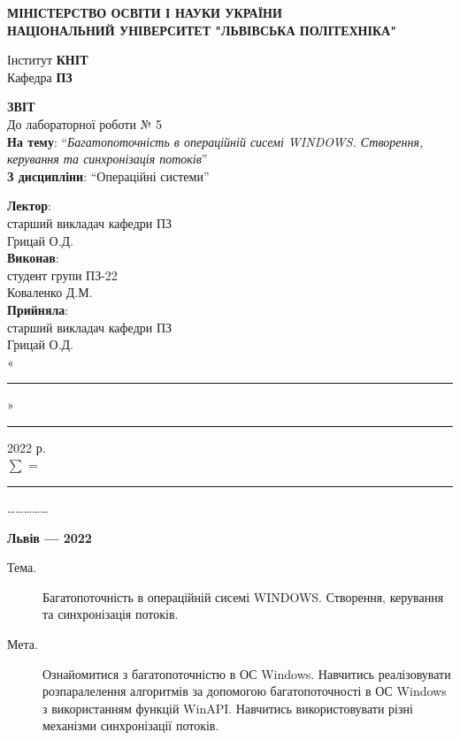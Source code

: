 \documentclass{article}
\newcommand\subject{Операційні системи}
\newcommand\lecturer{старший викладач кафедри ПЗ\\Грицай О.Д.}
\newcommand\teacher{старший викладач кафедри ПЗ\\Грицай О.Д.}
\newcommand\mygroup{ПЗ-22}
\newcommand\lab{5}
\newcommand\theme{Багатопоточність в операційній сисемі WINDOWS. Створення,
	керування та синхронізація потоків}
\newcommand\purpose{Ознайомитися з багатопоточністю в ОС Windows. Навчитись
	реалізовувати розпаралелення алгоритмів за допомогою багатопоточності в ОС
	Windows з використанням функцій WinAPI. Навчитись використовувати різні
	механізми синхронізації потоків}
\begin{document}
\begin{normalsize}
	\begin{titlepage}
		\thispagestyle{empty}
		\begin{center}
			\textbf{МІНІСТЕРСТВО ОСВІТИ І НАУКИ УКРАЇНИ\\
				НАЦІОНАЛЬНИЙ УНІВЕРСИТЕТ "ЛЬВІВСЬКА ПОЛІТЕХНІКА"}
		\end{center}
		\begin{flushright}
			Інститут \textbf{КНІТ}\\
			Кафедра \textbf{ПЗ}
		\end{flushright}
		\vspace{200pt}
		\begin{center}
			\textbf{ЗВІТ}\\
			\vspace{10pt}
			До лабораторної роботи № \lab\\
			\textbf{На тему}: “\textit{\theme}”\\
			\textbf{З дисципліни}: “\subject”
		\end{center}
		\vspace{112pt}
		\begin{flushright}
			
			\textbf{Лектор}:\\
			\lecturer\\
			\vspace{28pt}
			\textbf{Виконав}:\\
			
			студент групи \mygroup\\
			Коваленко Д.М.\\
			\vspace{28pt}
			\textbf{Прийняла}:\\
			
			\teacher\\
			
			\vspace{28pt}
			«\rule{1cm}{0.15mm}» \rule{1.5cm}{0.15mm} 2022 р.\\
			$\sum$ = \rule{1cm}{0.15mm}……………\\
			
		\end{flushright}
		\vspace{\fill}
		\begin{center}
			\textbf{Львів — 2022}
		\end{center}
	\end{titlepage}
		
	\begin{description}
		\item[Тема.] \theme.
		\item[Мета.] \purpose.
	\end{description}


\end{normalsize}
\end{document}
